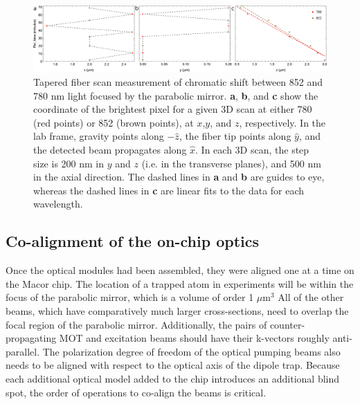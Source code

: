 \begin{figure}
    \centering
    \includegraphics[width=\textwidth]{Images/fiberscan_852_780_xyz_fig.pdf}
    \caption{Tapered fiber scan measurement of chromatic shift between 852 and 780 nm light focused by the parabolic mirror. \textbf{a}, \textbf{b}, and \textbf{c} show the coordinate of the brightest pixel for a given 3D scan at either 780 (red points) or 852 (brown points), at $x$,$y$, and $z$, respectively. In the lab frame, gravity points along $-\hat{z}$, the fiber tip points along $\hat{y}$, and the detected beam propagates along $\hat{x}$. In each 3D scan, the step size is 200 nm in $y$ and $z$ (i.e. in the transverse planes), and 500 nm in the axial direction. The dashed lines in \textbf{a} and \textbf{b} are guides to eye, whereas the dashed lines in \textbf{c} are linear fits to the data for each wavelength.}
    \label{fig:780_852_fiber_scan}
\end{figure}

\subsection{Co-alignment of the on-chip optics}

Once the optical modules had been assembled, they were aligned one at a time on the Macor chip. The location of a trapped atom in experiments will be within the focus of the parabolic mirror, which is a volume of order 1 $\mu$m$^3$ All of the other beams, which have comparatively much larger cross-sections, need to overlap the focal region of the parabolic mirror. Additionally, the pairs of counter-propagating MOT and excitation beams should have their k-vectors roughly anti-parallel. The polarization degree of freedom of the optical pumping beams also needs to be aligned with respect to the optical axis of the dipole trap. Because each additional optical model added to the chip introduces an additional blind spot, the order of operations to co-align the beams is critical. 

